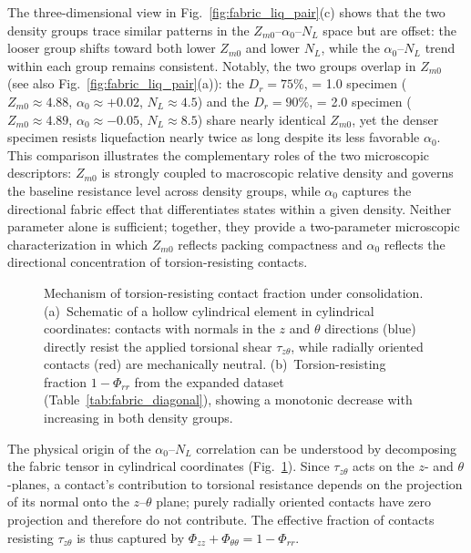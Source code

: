 The three-dimensional view in Fig.~\ref{fig:fabric_liq_pair}(c) shows that the two density groups trace similar patterns in the $Z_{m0}$--$\alpha_0$--$N_L$ space but are offset: the looser group shifts toward both lower $Z_{m0}$ and lower $N_L$, while the $\alpha_0$--$N_L$ trend within each group remains consistent. Notably, the two groups overlap in $Z_{m0}$ (see also Fig.~\ref{fig:fabric_liq_pair}(a)): the $D_r = 75\%$, \Kzero{} = 1.0 specimen ($Z_{m0} \approx 4.88$, $\alpha_0 \approx +0.02$, $N_L \approx 4.5$) and the $D_r = 90\%$, \Kzero{} = 2.0 specimen ($Z_{m0} \approx 4.89$, $\alpha_0 \approx -0.05$, $N_L \approx 8.5$) share nearly identical $Z_{m0}$, yet the denser specimen resists liquefaction nearly twice as long despite its less favorable $\alpha_0$. This comparison illustrates the complementary roles of the two microscopic descriptors: $Z_{m0}$ is strongly coupled to macroscopic relative density and governs the baseline resistance level across density groups, while $\alpha_0$ captures the directional fabric effect that differentiates \Kzero{} states within a given density. Neither parameter alone is sufficient; together, they provide a two-parameter microscopic characterization in which $Z_{m0}$ reflects packing compactness and $\alpha_0$ reflects the directional concentration of torsion-resisting contacts.

\begin{figure}[t]
  \centering
  \caption{Mechanism of torsion-resisting contact fraction under \Kzero{} consolidation. (a)~Schematic of a hollow cylindrical element in cylindrical coordinates: contacts with normals in the $z$ and $\theta$ directions (blue) directly resist the applied torsional shear $\tau_{z\theta}$, while radially oriented contacts (red) are mechanically neutral. (b)~Torsion-resisting fraction $1-\Phi_{rr}$ from the expanded dataset (Table~\ref{tab:fabric_diagonal}), showing a monotonic decrease with increasing \Kzero{} in both density groups.}
  \label{fig:fabric_mechanism}
\end{figure}

The physical origin of the $\alpha_0$--$N_L$ correlation can be understood by decomposing the fabric tensor in cylindrical coordinates (Fig.~\ref{fig:fabric_mechanism}). Since $\tau_{z\theta}$ acts on the $z$- and $\theta$-planes, a contact's contribution to torsional resistance depends on the projection of its normal onto the $z$--$\theta$ plane; purely radially oriented contacts have zero projection and therefore do not contribute. The effective fraction of contacts resisting $\tau_{z\theta}$ is thus captured by $\Phi_{zz} + \Phi_{\theta\theta} = 1 - \Phi_{rr}$.

